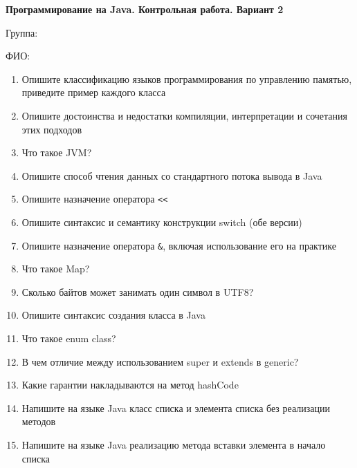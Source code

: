 \documentclass[12pt]{article}
\begin{document}
\newpage\begin{minipage}{\textwidth}
\textbf{Программирование на Java. Контрольная работа. Вариант 2}

Группа: \underline{\hspace{3cm}}

ФИО: \underline{\hspace{10cm}}

\begin{enumerate}
\item Опишите классификацию языков программирования по управлению памятью, приведите пример каждого класса
\item Опишите достоинства и недостатки компиляции, интерпретации и сочетания этих подходов
\item Что такое JVM?
\item Опишите способ чтения данных со стандартного потока вывода в Java
\item Опишите назначение оператора \verb|<<|
\item Опишите синтаксис и семантику конструкции switch (обе версии)
\item Опишите назначение оператора \verb|&|, включая использование его на практике
\item Что такое Map?
\item Сколько байтов может занимать один символ в UTF8?
\item Опишите синтаксис создания класса в Java
\item Что такое enum class?
\item В чем отличие между использованием super и extends в generic?
\item Какие гарантии накладываются на метод hashCode
\item Напишите на языке Java класс списка и элемента списка без реализации методов
\item Напишите на языке Java реализацию метода вставки элемента в начало списка

\end{enumerate}
\end{minipage}
\end{document}
